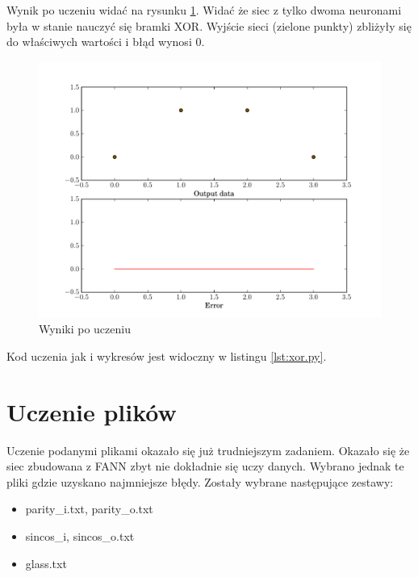 \documentclass[pointlessnumbers, abstracton, headsepline, a4paper]{scrartcl}
\begin{document}
Wynik po uczeniu widać na rysunku \ref{fig:xor_learned}. Widać że siec z tylko dwoma neuronami była w stanie nauczyć się bramki XOR. Wyjście sieci (zielone punkty) zbliżyły się do właściwych wartości i błąd wynosi 0.

\begin{figure}[!h]
\centering
\includegraphics[scale=0.8]{src/xor/xor_trained.pdf}\caption{\label{fig:xor_learned}Wyniki po uczeniu}
\end{figure}

Kod uczenia jak i wykresów jest widoczny w listingu \ref{lst:xor.py}.

\clearpage
\begin{center}
\lstset{captionpos=b,caption=Kod uczenia bramki XOR,label=lst:xor.py}

\end{center}

\clearpage
\section{Uczenie plików}
Uczenie podanymi plikami okazało się już trudniejszym zadaniem. Okazało się że siec zbudowana z FANN zbyt nie dokładnie się uczy danych. Wybrano jednak te pliki gdzie uzyskano najmniejsze błędy. Zostały wybrane następujące zestawy:

\begin{itemize}
\item parity\_i.txt, parity\_o.txt
\item sincos\_i, sincos\_o.txt
\item glass.txt
\end{itemize}
\end{document}
